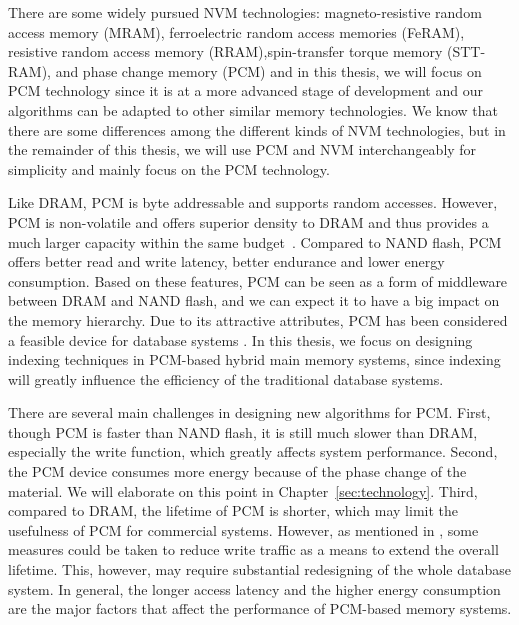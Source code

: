 
There are some widely pursued NVM technologies: magneto-resistive random
access memory (MRAM),
ferroelectric random access memories (FeRAM), resistive random access memory (RRAM),spin-transfer torque memory (STT-RAM),
and phase change memory (PCM)\cite{muller2003emerging} and in this thesis, we will focus on PCM technology since it is at a more advanced stage of development and our algorithms can be adapted to other similar memory technologies. We know that there are some differences among the different kinds of NVM technologies, but in the remainder of this thesis, we will use PCM and NVM interchangeably for simplicity and mainly focus on the PCM technology.


Like DRAM, PCM is byte addressable
and supports random accesses.
However, PCM is non-volatile and offers superior density to DRAM and
thus provides a much larger capacity within the same budget~\cite{qureshi2009scalable}.
Compared to NAND flash,
PCM offers better read and write latency,
better endurance and lower energy consumption.
Based on these features, PCM can be seen as a form of middleware between DRAM
and NAND flash, and we can expect it to have a big impact on the memory hierarchy.
Due to its attractive attributes, PCM
has been considered a feasible device for
database systems \cite{qureshi2009scalable,chen2011rethinking}.
In this thesis, we focus on designing indexing techniques in PCM-based
hybrid main memory systems, since indexing will greatly influence the efficiency of the traditional
database systems.

There are several main challenges in designing new algorithms for PCM.
First, though PCM is faster than NAND flash,
it is still much slower than DRAM,
especially the write function,
which greatly affects system performance.
Second, the PCM device consumes
more energy because of the phase change of the
material. We will elaborate on this point in
Chapter~\ref{sec:technology}.
Third, compared to DRAM,
the lifetime of PCM is shorter, which may limit the
usefulness of PCM for commercial systems.
However, as mentioned in \cite{qureshi2009scalable,chen2011rethinking},
some measures could be taken to reduce write traffic
as a means to extend the overall lifetime. This, however, may require substantial redesigning
of the whole database system.
In general,
the longer access latency and the
higher energy consumption are the major factors that affect the
performance of PCM-based memory systems.

